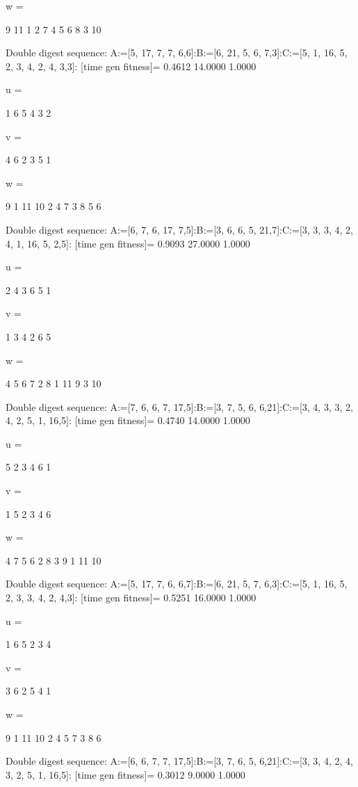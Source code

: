 w =

     9    11     1     2     7     4     5     6     8     3    10

Double digest sequence:
A:=[5, 17, 7, 7, 6,6]:B:=[6, 21, 5, 6, 7,3]:C:=[5, 1, 16, 5, 2, 3, 4, 2, 4, 3,3]:
[time gen fitness]=
    0.4612   14.0000    1.0000


u =

     1     6     5     4     3     2


v =

     4     6     2     3     5     1


w =

     9     1    11    10     2     4     7     3     8     5     6

Double digest sequence:
A:=[6, 7, 6, 17, 7,5]:B:=[3, 6, 6, 5, 21,7]:C:=[3, 3, 3, 4, 2, 4, 1, 16, 5, 2,5]:
[time gen fitness]=
    0.9093   27.0000    1.0000


u =

     2     4     3     6     5     1


v =

     1     3     4     2     6     5


w =

     4     5     6     7     2     8     1    11     9     3    10

Double digest sequence:
A:=[7, 6, 6, 7, 17,5]:B:=[3, 7, 5, 6, 6,21]:C:=[3, 4, 3, 3, 2, 4, 2, 5, 1, 16,5]:
[time gen fitness]=
    0.4740   14.0000    1.0000


u =

     5     2     3     4     6     1


v =

     1     5     2     3     4     6


w =

     4     7     5     6     2     8     3     9     1    11    10

Double digest sequence:
A:=[5, 17, 7, 6, 6,7]:B:=[6, 21, 5, 7, 6,3]:C:=[5, 1, 16, 5, 2, 3, 3, 4, 2, 4,3]:
[time gen fitness]=
    0.5251   16.0000    1.0000


u =

     1     6     5     2     3     4


v =

     3     6     2     5     4     1


w =

     9     1    11    10     2     4     5     7     3     8     6

Double digest sequence:
A:=[6, 6, 7, 7, 17,5]:B:=[3, 7, 6, 5, 6,21]:C:=[3, 3, 4, 2, 4, 3, 2, 5, 1, 16,5]:
[time gen fitness]=
    0.3012    9.0000    1.0000


